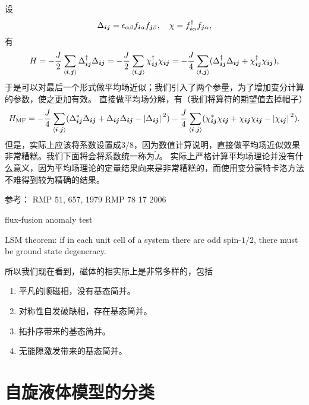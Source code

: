 设
\begin{equation}
    {\Delta}_{\vb*{i} \vb*{j}} = \epsilon_{\alpha \beta} {f}_{\vb*{i} \alpha} {f}_{\vb*{j} \beta}, \quad {\chi} = {f}^\dagger_{\vb*{i} \alpha} {f}_{\vb*{j} \alpha},
\end{equation}
有
\begin{equation}
    {H} = - \frac{J}{2} \sum_{\langle \vb*{i}, \vb*{j} \rangle} {\Delta}^\dagger_{\vb*{i} \vb*{j}} {\Delta}_{\vb*{i} \vb*{j}} = - \frac{J}{2} \sum_{\langle \vb*{i}, \vb*{j} \rangle} {\chi}_{\vb*{i} \vb*{j}}^\dagger {\chi}_{\vb*{i} \vb*{j}} = - \frac{J}{4} \sum_{\langle \vb*{i}, \vb*{j} \rangle} ({\Delta}^\dagger_{\vb*{i} \vb*{j}} {\Delta}_{\vb*{i} \vb*{j}} + {\chi}^\dagger_{\vb*{i} \vb*{j}} {\chi}_{\vb*{i} \vb*{j}}),
\end{equation}
于是可以对最后一个形式做平均场近似；我们引入了两个参量，为了增加变分计算的参数，使之更加有效。
直接做平均场分解，有（我们将算符的期望值去掉帽子）
\[
    {H}_\text{MF} = - \frac{J}{4} \sum_{\langle \vb*{i}, \vb*{j} \rangle} (\Delta_{\vb*{i} \vb*{j}}^* {\Delta}_{\vb*{i} \vb*{j}} + {\Delta}_{\vb*{i} \vb*{j}} \Delta_{\vb*{i} \vb*{j}} - \abs*{\Delta_{\vb*{i} \vb*{j}}}^2) - \frac{J}{4} \sum_{\langle \vb*{i}, \vb*{j} \rangle} (\chi_{\vb*{i} \vb*{j}}^* {\chi}_{\vb*{i} \vb*{j}} + {\chi}_{\vb*{i} \vb*{j}} \chi_{\vb*{i} \vb*{j}} - \abs*{\chi_{\vb*{i} \vb*{j}}}^2).
\]
但是，实际上应该将系数设置成$3/8$，因为数值计算说明，直接做平均场近似效果非常糟糕。我们下面将会将系数统一称为$\tilde{J}$。
实际上严格计算平均场理论并没有什么意义，因为平均场理论的定量结果向来是非常糟糕的，而使用变分蒙特卡洛方法不难得到较为精确的结果。

参考： 
RMP 51, 657, 1979
RMP 78 17 2006

flux-fusion anomaly test

LSM theorem: if in each unit cell of a system there are odd spin-$1/2$, there must be ground state degeneracy.

所以我们现在看到，磁体的相实际上是非常多样的，包括
\begin{enumerate}
    \item 平凡的顺磁相，没有基态简并。
    \item 对称性自发破缺相，存在基态简并。
    \item 拓扑序带来的基态简并。
    \item 无能隙激发带来的基态简并。
\end{enumerate}

\section{自旋液体模型的分类}

